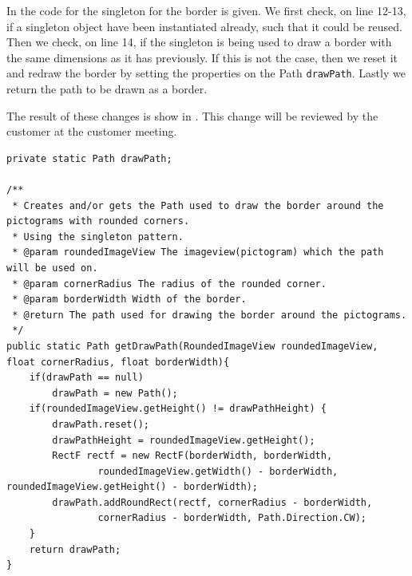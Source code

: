 In  the code for the singleton for the border is given. 
We first check, on line 12-13, if a singleton object have been instantiated already, such that it could be reused. 
Then we check, on line 14, if the singleton is being used to draw a border with the same dimensions as it has previously. 
If this is not the case, then we reset it and redraw the border by setting the properties on the Path \texttt{drawPath}. 
Lastly we return the path to be drawn as a border. 

The result of these changes is show in . 
This change will be reviewed by the customer at the customer meeting. 

\begin{lstlisting}[float, floatplacement=h, caption={One of the singletons used to solve this task.}, label={lst:singleton_example}] 
private static Path drawPath;

/**
 * Creates and/or gets the Path used to draw the border around the pictograms with rounded corners.
 * Using the singleton pattern.
 * @param roundedImageView The imageview(pictogram) which the path will be used on.
 * @param cornerRadius The radius of the rounded corner.
 * @param borderWidth Width of the border.
 * @return The path used for drawing the border around the pictograms.
 */
public static Path getDrawPath(RoundedImageView roundedImageView, float cornerRadius, float borderWidth){
    if(drawPath == null)
        drawPath = new Path();
    if(roundedImageView.getHeight() != drawPathHeight) {
        drawPath.reset();
        drawPathHeight = roundedImageView.getHeight();
        RectF rectf = new RectF(borderWidth, borderWidth,
                roundedImageView.getWidth() - borderWidth, roundedImageView.getHeight() - borderWidth);
        drawPath.addRoundRect(rectf, cornerRadius - borderWidth,
                cornerRadius - borderWidth, Path.Direction.CW);
    }
    return drawPath;
}
\end{lstlisting} 

